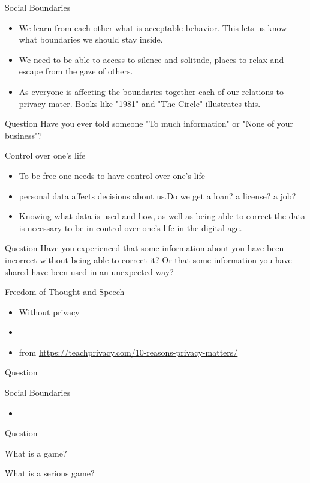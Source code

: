 \documentclass{beamer}
\begin{document}
\begin{frame}{Social Boundaries}
\begin{itemize}
  \item We learn from each other what is acceptable behavior. This lets us know what boundaries we should stay inside.
  \item We need to be able to access to silence and solitude, places to relax and escape from the gaze of others.
  \item As everyone is affecting the boundaries together each of our relations to privacy mater. Books like "1981" and "The Circle" illustrates this.
\end{itemize}
\begin{block}{Question}
Have you ever told someone "To much information" or "None of your business"?
\end{block}
\end{frame}





\begin{frame}{Control over one's life}
\begin{itemize}
  \item To be free one needs to have control over one's life
  \item personal data affects decisions about us.Do we get a loan? a license? a job?
  \item Knowing what data is used and how, as well as being able to correct the data is necessary to be in control over one's life in the digital age.
\end{itemize}
\begin{block}{Question}
Have you experienced that some information about you have been incorrect without being able to correct it? Or that some information you have shared have been used in an unexpected way?
\end{block}
\end{frame}


\begin{frame}{Freedom of Thought and Speech}
\begin{itemize}
  \item Without privacy
  \item
  \item from \url{https://teachprivacy.com/10-reasons-privacy-matters/}
\end{itemize}
\begin{block}{Question}

\end{block}
\end{frame}


\begin{frame}{Social Boundaries}
\begin{itemize}
  \item
\end{itemize}
\begin{block}{Question}

\end{block}
\end{frame}


\begin{frame}{What is a game?}

\end{frame}


\begin{frame}{What is a serious game?}

\end{frame}
\end{document}
